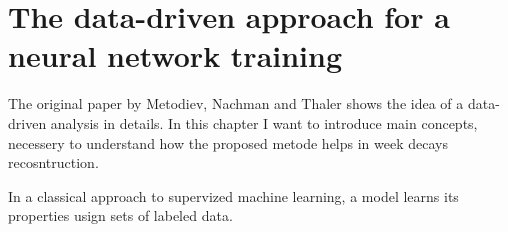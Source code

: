 \chapter{The data-driven approach for a neural network training}
\label{appendix:data_driven}
The original paper by Metodiev, Nachman and Thaler \cite{Metodiev_2017} shows the idea of a data-driven analysis in details. In this chapter I want to introduce main concepts, necessery to understand how the proposed metode helps in week decays recosntruction.

In a classical approach to supervized machine learning, a model learns its properties usign sets of labeled data. 






